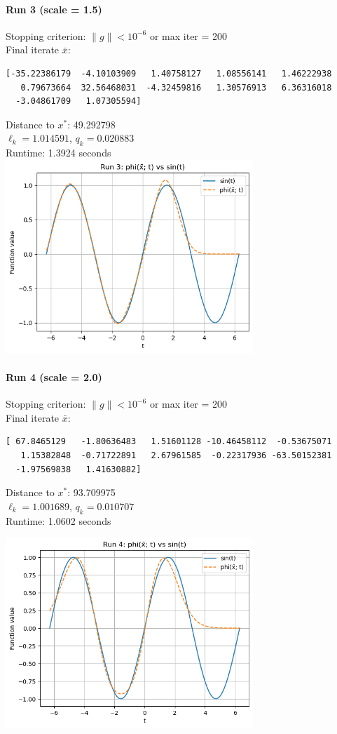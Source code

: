 \documentclass[12pt]{article}
\begin{document}
\paragraph{Run 3 (scale = 1.5)}
Stopping criterion: $\|g\| < 10^{-6}$ or max iter = 200\\
Final iterate $\bar{x}$:
\begin{verbatim}
[-35.22386179  -4.10103909   1.40758127   1.08556141   1.46222938
   0.79673664  32.56468031  -4.32459816   1.30576913   6.36316018
  -3.04861709   1.07305594]
\end{verbatim}
Distance to $x^*$: 49.292798\\
$\ell_k = 1.014591$, $q_k = 0.020883$\\
Runtime: 1.3924 seconds
\includegraphics[width=0.7\textwidth]{figures/plot_3.png}

\paragraph{Run 4 (scale = 2.0)}
Stopping criterion: $\|g\| < 10^{-6}$ or max iter = 200\\
Final iterate $\bar{x}$:
\begin{verbatim}
[ 67.8465129   -1.80636483   1.51601128 -10.46458112  -0.53675071
   1.15382848  -0.71722891   2.67961585  -0.22317936 -63.50152381
  -1.97569838   1.41630882]
\end{verbatim}
Distance to $x^*$: 93.709975\\
$\ell_k = 1.001689$, $q_k = 0.010707$\\
Runtime: 1.0602 seconds

\includegraphics[width=0.7\textwidth]{figures/plot_4.png}
\end{document}
